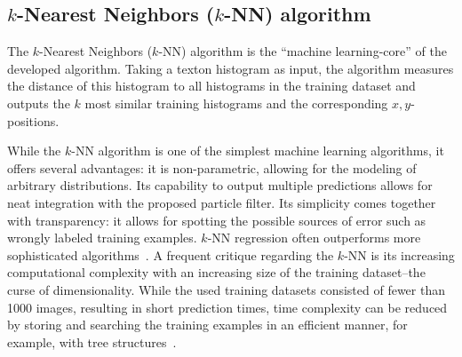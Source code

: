 \documentclass{report}
\begin{document}
\subsection{$k$-Nearest Neighbors ($k$-NN) algorithm}
\label{sec:knn}

The $k$-Nearest Neighbors ($k$-NN) algorithm is the ``machine
learning-core'' of the developed algorithm. Taking a texton histogram
as input, the algorithm measures the distance of this histogram to all
histograms in the training dataset and outputs the $k$ most similar
training histograms and the corresponding $x,y$-positions.

While the $k$-NN algorithm is one of the simplest machine learning
algorithms, it offers several advantages: it is non-parametric,
allowing for the modeling of arbitrary distributions. Its capability
to output multiple predictions allows for neat integration with the
proposed particle filter. Its simplicity comes together with
transparency: it allows for spotting the possible sources of error
such as wrongly labeled training examples. $k$-NN regression often
outperforms more sophisticated algorithms~\cite{knn}. A frequent
critique regarding the $k$-NN is its increasing computational
complexity with an increasing size of the training dataset--the curse
of dimensionality. While the used training datasets consisted of fewer
than 1000 images, resulting in short prediction times, time complexity
can be reduced by storing and searching the training examples in an
efficient manner, for example, with tree
structures~\cite{bhatia2010survey}.

\end{document}
